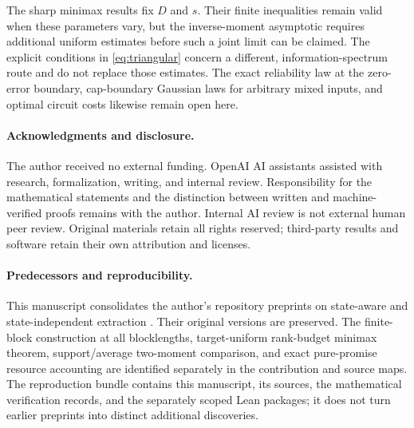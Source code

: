The sharp minimax results fix $D$ and $s$. Their finite inequalities remain valid when these parameters vary, but the inverse-moment asymptotic requires additional uniform estimates before such a joint limit can be claimed. The explicit conditions in \eqref{eq:triangular} concern a different, information-spectrum route and do not replace those estimates. The exact reliability law at the zero-error boundary, cap-boundary Gaussian laws for arbitrary mixed inputs, and optimal circuit costs likewise remain open here.

\paragraph{Acknowledgments and disclosure.}
The author received no external funding. OpenAI AI assistants assisted with research, formalization, writing, and internal review. Responsibility for the mathematical statements and the distinction between written and machine-verified proofs remains with the author. Internal AI review is not external human peer review. Original materials retain all rights reserved; third-party results and software retain their own attribution and licenses.

\paragraph{Predecessors and reproducibility.}
This manuscript consolidates the author's repository preprints on state-aware and state-independent extraction \cite{zhang-extraction,zhang-universal}. Their original versions are preserved. The finite-block construction at all blocklengths, target-uniform rank-budget minimax theorem, support/average two-moment comparison, and exact pure-promise resource accounting are identified separately in the contribution and source maps. The reproduction bundle contains this manuscript, its sources, the mathematical verification records, and the separately scoped Lean packages; it does not turn earlier preprints into distinct additional discoveries.

